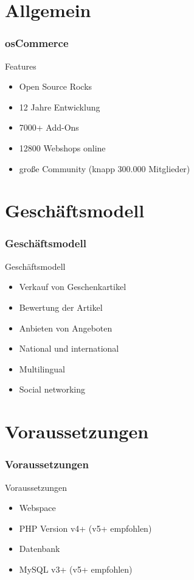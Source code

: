 \documentclass[xcolor=dvipsnames]{beamer}
\begin{document}
\section{Allgemein}
\begin{frame} %
  \frametitle{osCommerce} %
  \begin{block}{Features}
	  \begin{itemize}
		\item Open Source Rocks
		\item 12 Jahre Entwicklung
		\item 7000+ Add-Ons
		\item 12800 Webshops online
		\item große Community (knapp 300.000 Mitglieder)
	  \end{itemize}
  \end{block}
\end{frame}

\section{Geschäftsmodell}
\begin{frame} %
  \frametitle{Geschäftsmodell} %
  \begin{block}{Geschäftsmodell}
	  \begin{itemize}
		\item Verkauf von Geschenkartikel
		\item Bewertung der Artikel
		\item Anbieten von Angeboten
		\item National und international
		\item Multilingual
		\item Social networking
	  \end{itemize}
  \end{block}
\end{frame}

\section{Voraussetzungen}
\begin{frame} %
  \frametitle{Voraussetzungen} %
  \begin{block}{Voraussetzungen}
	  \begin{itemize}
		\item Webspace
		\item PHP Version v4+ (v5+ empfohlen)
		\item Datenbank
		\item MySQL v3+ (v5+ empfohlen)
	  \end{itemize}
  \end{block}
\end{frame}
\end{document}
